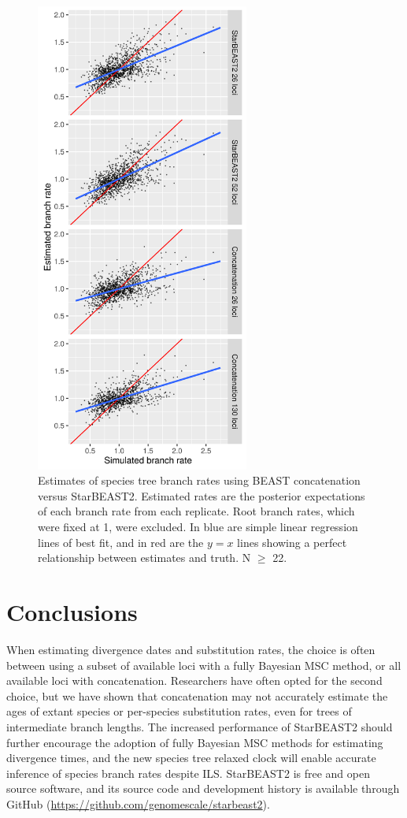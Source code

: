 \documentclass[12pt]{article}
\begin{document}
\begin{figure}[htb!]
\centering
\includegraphics[width=70mm]{branch_rates_phased.png}
\caption
{Estimates of species tree branch rates using BEAST concatenation versus
StarBEAST2. Estimated rates are the posterior expectations of each branch rate
from each replicate. Root branch rates, which were fixed at 1, were excluded.
In blue are simple linear regression lines of best fit, and in red are the $y
= x$ lines showing a perfect relationship between estimates and truth. N $\ge$ 22.}
\label{fig:branchRates}
\end{figure}

\section{Conclusions}

When estimating divergence dates and substitution rates, the choice is often
between using a subset of available loci with a fully Bayesian MSC method, or
all available loci with concatenation. Researchers have often opted for the
second choice, but we have shown that concatenation may not accurately
estimate the ages of extant species or per-species substitution rates, even
for trees of intermediate branch lengths. The increased performance of
StarBEAST2 should further encourage the adoption of fully Bayesian MSC methods
for estimating divergence times, and the new species tree relaxed clock will
enable accurate inference of species branch rates despite ILS. StarBEAST2 is
free and open source software, and its source code and development history is
available through GitHub (\url{https://github.com/genomescale/starbeast2}).
\end{document}
